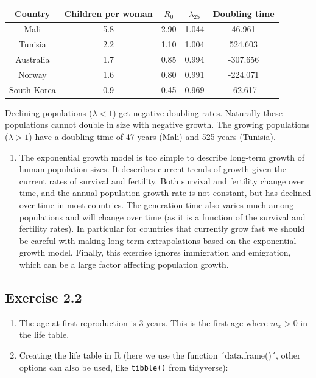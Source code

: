\documentclass[
]{book}
\providecommand{\tightlist}{%
  \setlength{\itemsep}{0pt}\setlength{\parskip}{0pt}}
\begin{document}
\begin{tabular}{ccccc}
\toprule
Country & Children per woman & $R_0$ & $\lambda_{25}$ & Doubling time\\
\midrule
Mali & 5.8 & 2.90 & 1.044 & 46.961\\
Tunisia & 2.2 & 1.10 & 1.004 & 524.603\\
Australia & 1.7 & 0.85 & 0.994 & -307.656\\
Norway & 1.6 & 0.80 & 0.991 & -224.071\\
South Korea & 0.9 & 0.45 & 0.969 & -62.617\\
\bottomrule
\end{tabular}

Declining populations (\(\lambda<1\)) get negative doubling rates. Naturally these populations cannot double in size with negative growth. The growing populations (\(\lambda>1\)) have a doubling time of 47 years (Mali) and 525 years (Tunisia).

\begin{enumerate}
\def\labelenumi{\arabic{enumi}.}
\setcounter{enumi}{2}
\tightlist
\item
  The exponential growth model is too simple to describe long-term growth of human population sizes. It describes current trends of growth given the current rates of survival and fertility. Both survival and fertility change over time, and the annual population growth rate is not constant, but has declined over time in most countries. The generation time also varies much among populations and will change over time (as it is a function of the survival and fertility rates). In particular for countries that currently grow fast we should be careful with making long-term extrapolations based on the exponential growth model. Finally, this exercise ignores immigration and emigration, which can be a large factor affecting population growth.
\end{enumerate}

\hypertarget{exercise-2.2-1}{%
\subsection*{Exercise 2.2}\label{exercise-2.2-1}}

\begin{enumerate}
\def\labelenumi{\arabic{enumi}.}
\item
  The age at first reproduction is 3 years. This is the first age where \(m_x>0\) in the life table.
\item
  Creating the life table in R (here we use the function ´data.frame()´, other options can also be used, like \texttt{tibble()} from tidyverse):
\end{enumerate}
\end{document}
